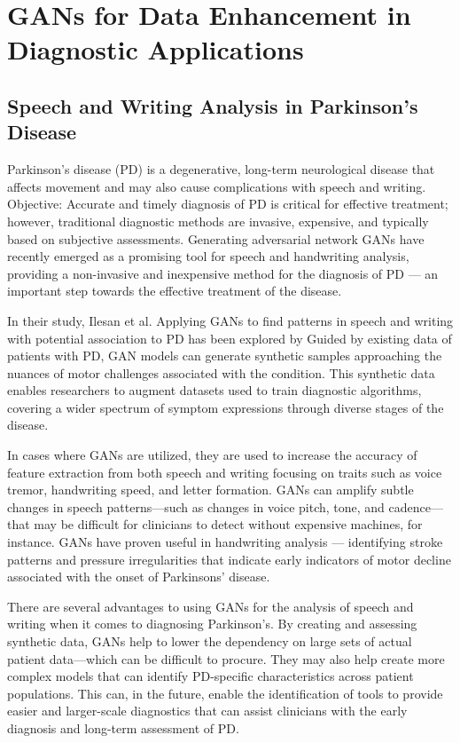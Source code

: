 \documentclass[12pt]{article}
\begin{document}
\section{GANs for Data Enhancement in Diagnostic Applications}
\subsection{Speech and Writing Analysis in Parkinson’s Disease}
Parkinson's disease (PD) is a degenerative, long-term neurological disease that affects movement and may also cause complications with speech and writing. Objective: Accurate and timely diagnosis of PD is critical for effective treatment; however, traditional diagnostic methods are invasive, expensive, and typically based on subjective assessments. Generating adversarial network GANs have recently emerged as a promising tool for speech and handwriting analysis, providing a non-invasive and inexpensive method for the diagnosis of PD — an important step towards the effective treatment of the disease.

In their study, Ilesan et al. Applying GANs to find patterns in speech and writing with potential association to PD has been explored by \cite{Ilesan2024} Guided by existing data of patients with PD, GAN models can generate synthetic samples approaching the nuances of motor challenges associated with the condition. This synthetic data enables researchers to augment datasets used to train diagnostic algorithms, covering a wider spectrum of symptom expressions through diverse stages of the disease.

In cases where GANs are utilized, they are used to increase the accuracy of feature extraction from both speech and writing focusing on traits such as voice tremor, handwriting speed, and letter formation. GANs can amplify subtle changes in speech patterns—such as changes in voice pitch, tone, and cadence—that may be difficult for clinicians to detect without expensive machines, for instance. GANs have proven useful in handwriting analysis — identifying stroke patterns and pressure irregularities that indicate early indicators of motor decline associated with the onset of Parkinsons' disease.

There are several advantages to using GANs for the analysis of speech and writing when it comes to diagnosing Parkinson's. By creating and assessing synthetic data, GANs help to lower the dependency on large sets of actual patient data—which can be difficult to procure. They may also help create more complex models that can identify PD-specific characteristics across patient populations. This can, in the future, enable the identification of tools to provide easier and larger-scale diagnostics that can assist clinicians with the early diagnosis and long-term assessment of PD.
\end{document}
